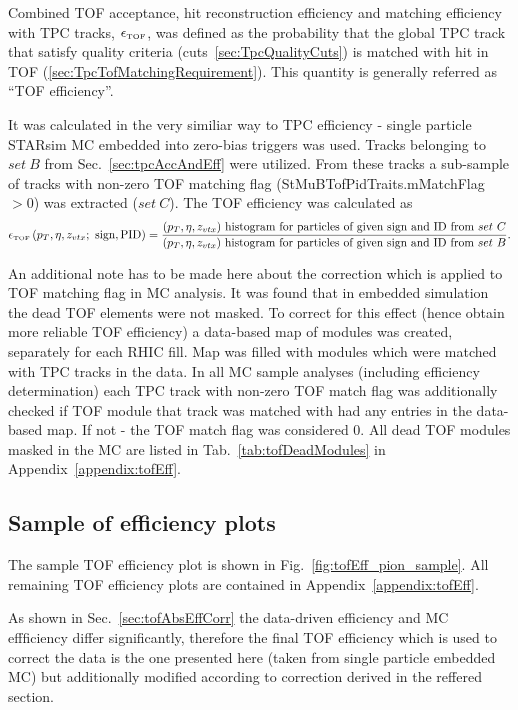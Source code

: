 Combined TOF acceptance, hit reconstruction efficiency and matching efficiency with TPC tracks, $\epsilon_{\textrm{\tiny TOF}}$, was defined as the probability that the global TPC track that satisfy quality criteria (cuts~\ref{sec:TpcQualityCuts}) is matched with hit in TOF (\ref{sec:TpcTofMatchingRequirement}). This quantity is generally referred as ``TOF efficiency''.

It was calculated in the very similiar way to TPC efficiency - single particle STARsim MC embedded into zero-bias triggers was used. Tracks belonging to $set~B$ from Sec.~\ref{sec:tpcAccAndEff} were utilized. From these tracks a sub-sample of tracks with non-zero TOF matching flag (StMuBTofPidTraits.mMatchFlag $>0$) was extracted ($set~C$). The TOF efficiency was calculated as
\begin{equation}\label{eq:tofAccAndEffDefinition}
		\epsilon_{\textrm{\tiny TOF}}\left(p_{T}, \eta, z_{vtx};~\textrm{sign},\textrm{PID}\right) = \frac{(p_{T},\eta, z_{vtx})~\textrm{histogram for particles of given sign and ID from}~set~C}{(p_{T},\eta, z_{vtx})~\textrm{histogram for particles of given sign and ID from}~set~B}.
	\end{equation}

An additional note has to be made here about the correction which is applied to TOF matching flag in MC analysis. It was found that in embedded simulation the dead TOF elements were not masked. To correct for this effect (hence obtain more reliable TOF efficiency) a data-based map of modules was created, separately for each RHIC fill. Map was filled with modules which were matched with TPC tracks in the data. In all MC sample analyses (including efficiency determination) each TPC track with non-zero TOF match flag was additionally checked if TOF module that track was matched with had any entries in the data-based map. If not - the TOF match flag was considered 0. All dead TOF modules masked in the MC are listed in Tab.~\ref{tab:tofDeadModules} in Appendix~\ref{appendix:tofEff}.

\subsection{Sample of  efficiency plots}

The sample TOF efficiency plot is shown in Fig.~\ref{fig:tofEff_pion_sample}. All remaining TOF efficiency plots are contained in Appendix~\ref{appendix:tofEff}.

As shown in Sec.~\ref{sec:tofAbsEffCorr} the data-driven efficiency and MC effficiency differ significantly, therefore the final TOF efficiency which is used to correct the data is the one presented here (taken from single particle embedded MC) but additionally modified according to correction derived in the reffered section.

